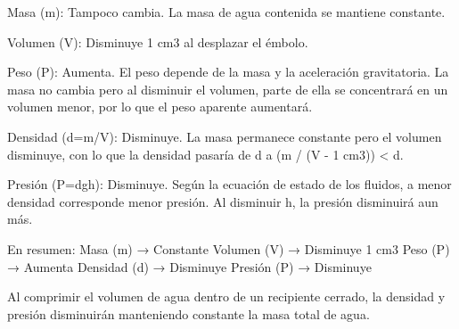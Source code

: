 \documentclass{article}
\begin{document}
\begin{itemize}
Masa (m): Tampoco cambia. La masa de agua contenida se mantiene constante.

Volumen (V): Disminuye 1 cm3 al desplazar el émbolo.

Peso (P): Aumenta. El peso depende de la masa y la aceleración gravitatoria. La masa no cambia pero al disminuir el volumen, parte de ella se concentrará en un volumen menor, por lo que el peso aparente aumentará.

Densidad (d=m/V): Disminuye. La masa permanece constante pero el volumen disminuye, con lo que la densidad pasaría de d a (m / (V - 1 cm3)) < d.

Presión (P=dgh): Disminuye. Según la ecuación de estado de los fluidos, a menor densidad corresponde menor presión. Al disminuir h, la presión disminuirá aun más.

En resumen:
Masa (m) → Constante
Volumen (V) → Disminuye 1 cm3
Peso (P) → Aumenta
Densidad (d) → Disminuye
Presión (P) → Disminuye

Al comprimir el volumen de agua dentro de un recipiente cerrado, la densidad y presión disminuirán manteniendo constante la masa total de agua.


\end{itemize}
\end{document}
